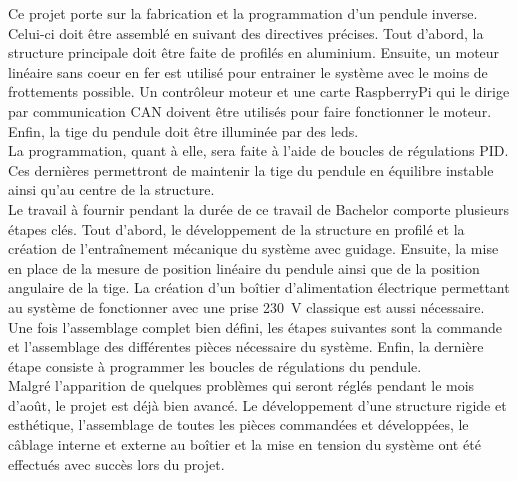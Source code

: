 Ce projet porte sur la fabrication et la programmation d'un pendule inverse. Celui-ci doit être assemblé en suivant des directives précises.
Tout d'abord, la structure principale doit être faite de profilés en aluminium. Ensuite, un moteur linéaire sans coeur en fer est utilisé pour
entrainer le système avec le moins de frottements possible. Un contrôleur moteur et une carte RaspberryPi qui le dirige par communication \gls{CAN}
doivent être utilisés pour faire fonctionner le moteur. Enfin, la tige du pendule doit être illuminée par des leds.\\

La programmation, quant à elle, sera faite à l'aide de boucles de régulations \gls{PID}. Ces dernières permettront de maintenir la tige du pendule
en équilibre instable ainsi qu'au centre de la structure.\\

Le travail à fournir pendant la durée de ce travail de Bachelor comporte plusieurs étapes clés. Tout d'abord, le développement de la structure
en profilé et la création de l'entraînement mécanique du système avec guidage. Ensuite, la mise en place de la mesure de position linéaire
du pendule ainsi que de la position angulaire de la tige. La création d'un boîtier d'alimentation électrique permettant au système de
fonctionner avec une prise 230~V classique est aussi nécessaire. Une fois l'assemblage complet bien défini, les étapes suivantes sont la commande
et l'assemblage des différentes pièces nécessaire du système. Enfin, la dernière étape consiste à programmer les boucles de régulations du
pendule.\\

Malgré l'apparition de quelques problèmes qui seront réglés pendant le mois d'août, le projet est déjà bien avancé. Le développement d'une
structure rigide et esthétique, l'assemblage de toutes les pièces commandées et développées, le câblage interne et externe au boîtier et la mise
en tension du système ont été effectués avec succès lors du projet.